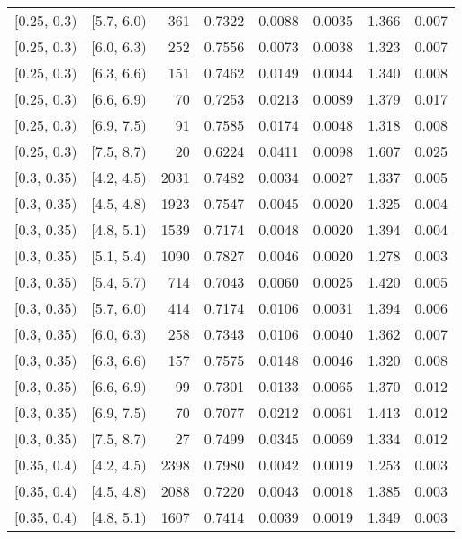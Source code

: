 \begin{longtable}{| l | l | r | r | r | r | r | r |}
        $[$0.25, 0.3$)$ & $[$5.7, 6.0$)$ & 361 & 0.7322 & 0.0088 & 0.0035 & 1.366 & 0.007 \\
        $[$0.25, 0.3$)$ & $[$6.0, 6.3$)$ & 252 & 0.7556 & 0.0073 & 0.0038 & 1.323 & 0.007 \\
        $[$0.25, 0.3$)$ & $[$6.3, 6.6$)$ & 151 & 0.7462 & 0.0149 & 0.0044 & 1.340 & 0.008 \\
        $[$0.25, 0.3$)$ & $[$6.6, 6.9$)$ & 70 & 0.7253 & 0.0213 & 0.0089 & 1.379 & 0.017 \\
        $[$0.25, 0.3$)$ & $[$6.9, 7.5$)$ & 91 & 0.7585 & 0.0174 & 0.0048 & 1.318 & 0.008 \\
        $[$0.25, 0.3$)$ & $[$7.5, 8.7$)$ & 20 & 0.6224 & 0.0411 & 0.0098 & 1.607 & 0.025 \\
        $[$0.3, 0.35$)$ & $[$4.2, 4.5$)$ & 2031 & 0.7482 & 0.0034 & 0.0027 & 1.337 & 0.005 \\
        $[$0.3, 0.35$)$ & $[$4.5, 4.8$)$ & 1923 & 0.7547 & 0.0045 & 0.0020 & 1.325 & 0.004 \\
        $[$0.3, 0.35$)$ & $[$4.8, 5.1$)$ & 1539 & 0.7174 & 0.0048 & 0.0020 & 1.394 & 0.004 \\
        $[$0.3, 0.35$)$ & $[$5.1, 5.4$)$ & 1090 & 0.7827 & 0.0046 & 0.0020 & 1.278 & 0.003 \\
        $[$0.3, 0.35$)$ & $[$5.4, 5.7$)$ & 714 & 0.7043 & 0.0060 & 0.0025 & 1.420 & 0.005 \\
        $[$0.3, 0.35$)$ & $[$5.7, 6.0$)$ & 414 & 0.7174 & 0.0106 & 0.0031 & 1.394 & 0.006 \\
        $[$0.3, 0.35$)$ & $[$6.0, 6.3$)$ & 258 & 0.7343 & 0.0106 & 0.0040 & 1.362 & 0.007 \\
        $[$0.3, 0.35$)$ & $[$6.3, 6.6$)$ & 157 & 0.7575 & 0.0148 & 0.0046 & 1.320 & 0.008 \\
        $[$0.3, 0.35$)$ & $[$6.6, 6.9$)$ & 99 & 0.7301 & 0.0133 & 0.0065 & 1.370 & 0.012 \\
        $[$0.3, 0.35$)$ & $[$6.9, 7.5$)$ & 70 & 0.7077 & 0.0212 & 0.0061 & 1.413 & 0.012 \\
        $[$0.3, 0.35$)$ & $[$7.5, 8.7$)$ & 27 & 0.7499 & 0.0345 & 0.0069 & 1.334 & 0.012 \\
        $[$0.35, 0.4$)$ & $[$4.2, 4.5$)$ & 2398 & 0.7980 & 0.0042 & 0.0019 & 1.253 & 0.003 \\
        $[$0.35, 0.4$)$ & $[$4.5, 4.8$)$ & 2088 & 0.7220 & 0.0043 & 0.0018 & 1.385 & 0.003 \\
        $[$0.35, 0.4$)$ & $[$4.8, 5.1$)$ & 1607 & 0.7414 & 0.0039 & 0.0019 & 1.349 & 0.003 \\

\end{longtable}

